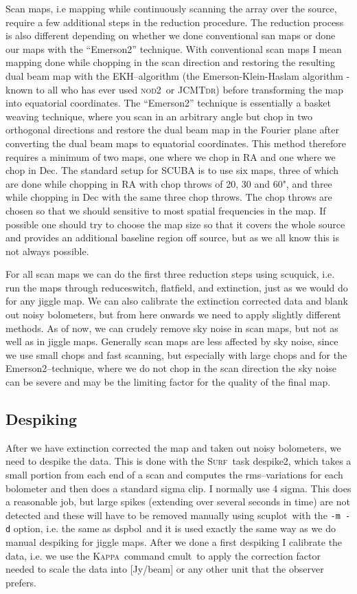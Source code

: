 \documentclass[twoside,11pt]{article}
\newcommand{\Kappa}{\xref{\textsc{Kappa}}{sun95}{}}
\newcommand{\surf}{\xref{\textsc{Surf}}{sun216}{}}
\newcommand{\jcmtdr}{\xref{\textsc{JCMTdr}}{sun132}{}}
\newcommand{\nod}{\textsc{nod2}}
\newcommand{\task}[1]{\textsf{#1}}
\newcommand{\desp}{\xref{\task{despike}}{sun216}{DESPIKE}}
\newcommand{\dspbol}{\xref{\task{dspbol}}{sun216}{DSPBOL}}
\newcommand{\resw}{\xref{\task{reduce\_switch}}{sun216}{REDUCE_SWITCH}}
\newcommand{\flatf}{\xref{\task{flatfield}}{sun216}{FLATFIELD}}
\newcommand{\ext}{\xref{\task{extinction}}{sun216}{EXTINCTION}}
\newcommand{\scuquick}{\xref{\task{scuquick}}{sun216}{SCUQUICK}}
\newcommand{\scuplot}{\xref{\task{scuplot}}{sun216}{SCUPLOT}}
\newcommand{\cmult}{\xref{\task{cmult}}{sun95}{CMULT}}
\newcommand{\xref}[3]{#1}
\newcommand{\xlabel}[1]{}
\renewcommand{\_}{\texttt{\symbol{95}}}
\begin{document}
Scan maps, i.e mapping while continuously scanning the array over the
source, require a few additional steps in the reduction procedure. The
reduction process is also different depending on whether we done
conventional san maps or done our maps with the ``Emerson2'' technique.
With conventional scan maps I mean mapping done while chopping in the
scan direction and restoring the resulting dual beam map with the
EKH--algorithm (the Emerson-Klein-Haslam algorithm - known to all who
has ever used \nod\ or \jcmtdr \cite{jcmtdr}) before transforming the map into
equatorial coordinates.  The ``Emerson2'' technique is essentially a
basket weaving technique, where you  scan in an arbitrary angle but
chop in two orthogonal directions and restore the dual beam map in the
Fourier plane after converting the dual beam maps to equatorial
coordinates. This method therefore requires a minimum of two maps, one
where we chop in RA and one where we chop in Dec. The standard setup
for SCUBA is to use six maps, three of which are done while chopping in
RA with chop throws of 20, 30 and 60", and three while chopping in Dec
with the same three chop throws. The chop throws are chosen so that we
should sensitive to most spatial frequencies in the map. If possible
one should try to choose the map size so that it covers the whole
source and provides an additional baseline region off source, but as we
all know this is not always possible.

For all scan maps we can do the first three reduction steps using
\scuquick, i.e. run the maps through \resw, \flatf, and \ext, just as
we would do for any jiggle map. We can also calibrate the extinction
corrected data and blank out noisy bolometers, but from here onwards we
need to apply slightly different methods. As of now, we can crudely
remove sky noise in scan maps, but not as well as in jiggle maps.
Generally scan maps are less affected by sky noise, since we use small
chops and fast scanning, but especially with large chops and for the
Emerson2--technique, where we do not chop in the scan direction the sky
noise can be severe and may be the limiting factor for the quality of
the final map.

\subsection{\xlabel{despiking_scan_maps}Despiking}

After we have extinction corrected the map and taken out noisy
bolometers, we need to despike the data. This is done with the
\surf\ task \desp2, which takes a small portion from each end of a scan
and computes the rms--variations for each bolometer and then does a
standard  sigma clip. I normally use 4 sigma. This does a reasonable
job, but large spikes (extending over several seconds in time) are not
detected and these will have to be removed manually using
\scuplot\ with the \texttt{-m -d} option, i.e. the same as \dspbol\,
and it is used exactly the same way as we do manual despiking for
jiggle maps. After we done a first despiking I calibrate the data,
i.e.  we use the \Kappa\ command \cmult\ to apply the correction factor
needed to scale the data into [Jy/beam] or any other unit that the
observer prefers.
\end{document}

